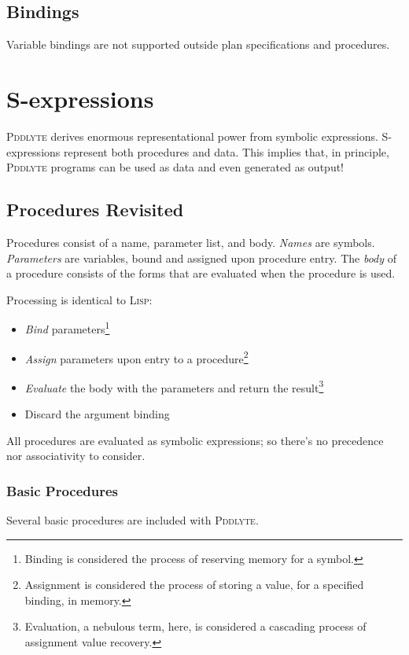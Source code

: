 \documentclass[
a4paper, %
11pt, %
onecolumn, %
openany, %
]{memoir}
\begin{document}
{\section{Bindings}
Variable bindings are not supported outside plan specifications and procedures. 


\chapter{S-expressions}

\textsc{Pddlyte} derives enormous representational power from symbolic expressions. S-expressions represent both procedures and data. This implies that, in principle, \textsc{Pddlyte} programs can be used as data and even generated as output!\\

\section{Procedures Revisited}
Procedures consist of a name, parameter list, and body. \textit{Names} are symbols. \textit{Parameters} are variables, bound and assigned upon procedure entry. The \textit{body} of a procedure consists of the forms that are evaluated when the procedure is used. 




Processing is identical to \textsc{Lisp}:
\begin{itemize}
\item{\textit{Bind} parameters\footnote{Binding is considered the process of reserving memory for a symbol.}}
\item{\textit{Assign} parameters upon entry to a procedure\footnote{Assignment is considered the process of storing a value, for a specified binding, in memory.}}
\item{\textit{Evaluate} the body with the parameters and return the result\footnote{Evaluation, a nebulous term, here, is considered a cascading process of assignment value recovery.}}
\item{Discard the argument binding}
\end{itemize}

All procedures are evaluated as symbolic expressions; so there's no precedence nor associativity to consider.

\subsection{Basic Procedures}
Several basic procedures are included with \textsc{Pddlyte}. \\

}
\end{document}
